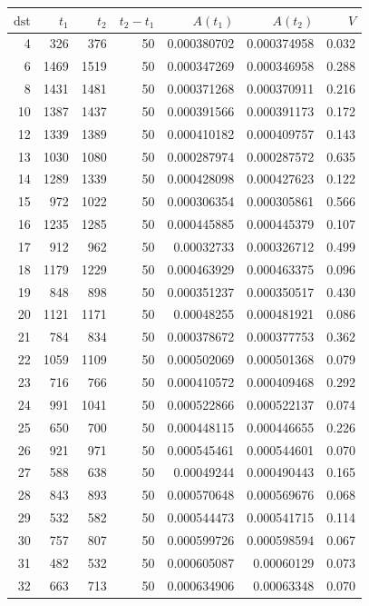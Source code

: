 \begin{tabular}{r r r r r r r}
\toprule
$\mathrm{dst}$ & $t_1$ & $t_2$ & $t_2-t_1$ & $A(t_1)$ & $A(t_2)$ & $V$ \\
\midrule
4 & 326 & 376 & 50 & 0.000380702 & 0.000374958 & 0.032 \\
6 & 1469 & 1519 & 50 & 0.000347269 & 0.000346958 & 0.288 \\
8 & 1431 & 1481 & 50 & 0.000371268 & 0.000370911 & 0.216 \\
10 & 1387 & 1437 & 50 & 0.000391566 & 0.000391173 & 0.172 \\
12 & 1339 & 1389 & 50 & 0.000410182 & 0.000409757 & 0.143 \\
13 & 1030 & 1080 & 50 & 0.000287974 & 0.000287572 & 0.635 \\
14 & 1289 & 1339 & 50 & 0.000428098 & 0.000427623 & 0.122 \\
15 & 972 & 1022 & 50 & 0.000306354 & 0.000305861 & 0.566 \\
16 & 1235 & 1285 & 50 & 0.000445885 & 0.000445379 & 0.107 \\
17 & 912 & 962 & 50 & 0.00032733 & 0.000326712 & 0.499 \\
18 & 1179 & 1229 & 50 & 0.000463929 & 0.000463375 & 0.096 \\
19 & 848 & 898 & 50 & 0.000351237 & 0.000350517 & 0.430 \\
20 & 1121 & 1171 & 50 & 0.00048255 & 0.000481921 & 0.086 \\
21 & 784 & 834 & 50 & 0.000378672 & 0.000377753 & 0.362 \\
22 & 1059 & 1109 & 50 & 0.000502069 & 0.000501368 & 0.079 \\
23 & 716 & 766 & 50 & 0.000410572 & 0.000409468 & 0.292 \\
24 & 991 & 1041 & 50 & 0.000522866 & 0.000522137 & 0.074 \\
25 & 650 & 700 & 50 & 0.000448115 & 0.000446655 & 0.226 \\
26 & 921 & 971 & 50 & 0.000545461 & 0.000544601 & 0.070 \\
27 & 588 & 638 & 50 & 0.00049244 & 0.000490443 & 0.165 \\
28 & 843 & 893 & 50 & 0.000570648 & 0.000569676 & 0.068 \\
29 & 532 & 582 & 50 & 0.000544473 & 0.000541715 & 0.114 \\
30 & 757 & 807 & 50 & 0.000599726 & 0.000598594 & 0.067 \\
31 & 482 & 532 & 50 & 0.000605087 & 0.00060129 & 0.073 \\
32 & 663 & 713 & 50 & 0.000634906 & 0.00063348 & 0.070 \\

\end{tabular}
